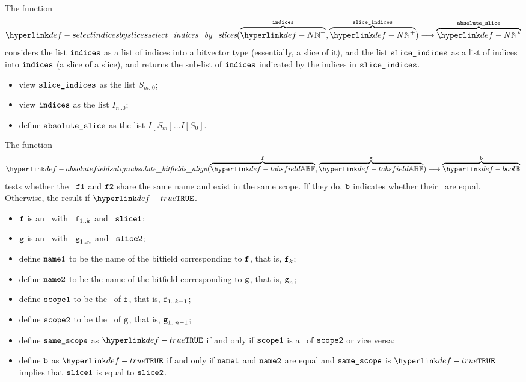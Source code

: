 \hypertarget{def-selectindicesbyslices}{}
The function
\[
\selectindicesbyslices(\overname{\N^+}{\indices}, \overname{\N^+}{\sliceindices})
\aslto \overname{\N^*}{\vabsslice}
\]
considers the list $\indices$ as a list of indices into a bitvector type (essentially, a slice of it),
and the list $\sliceindices$ as a list of indices into $\indices$ (a slice of a slice),
and returns the sub-list of $\indices$ indicated by the indices in $\sliceindices$.

\ProseParagraph
\AllApply
\begin{itemize}
  \item view $\sliceindices$ as the list $S_{m..0}$;
  \item view $\indices$ as the list $I_{n..0}$;
  \item define $\vabsslice$ as the list $I[S_m] \ldots I[S_0]$.
\end{itemize}

\FormallyParagraph
\begin{mathpar}
\end{mathpar}

\hypertarget{def-absolutefieldsalign}{}
The function
\[
\absolutebitfieldsalign(\overname{\TAbsField}{\vf}, \overname{\TAbsField}{\vg})
\aslto \overname{\Bool}{\vb}
\]
tests whether the \absolutebitfields\ $\vfone$ and $\vftwo$ share the same name
and exist in the same scope. If they do, $\vb$ indicates whether their \absoluteslices\
are equal. Otherwise, the result if $\True$.

\ProseParagraph
\AllApply
\begin{itemize}
  \item $\vf$ is an \absolutebitfield\ with \absolutename\ $\vf_{1..k}$ and \absoluteslice\ $\vsliceone$;
  \item $\vg$ is an \absolutebitfield\ with \absolutename\ $\vg_{1..n}$ and \absoluteslice\ $\vslicetwo$;
  \item define $\nameone$ to be the name of the bitfield corresponding to $\vf$, that is, $\vf_k$;
  \item define $\nametwo$ to be the name of the bitfield corresponding to $\vg$, that is, $\vg_n$;
  \item define $\vscopeone$ to be the \bitfieldscope\ of $\vf$, that is, $\vf_{1..k-1}$;
  \item define $\vscopetwo$ to be the \bitfieldscope\ of $\vg$, that is, $\vg_{1..n-1}$;
  \item define $\vsamescope$ as $\True$ if and only if $\vscopeone$ is a \listprefixterm\ of $\vscopetwo$ or vice versa;
  \item define $\vb$ as $\True$ if and only if $\nameone$ and $\nametwo$ are equal and $\vsamescope$ is $\True$ implies
        that $\vsliceone$ is equal to $\vslicetwo$.
\end{itemize}

